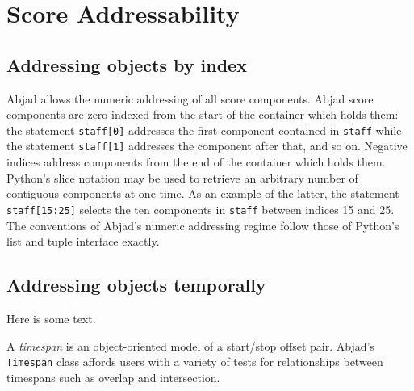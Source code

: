\section{Score Addressability}\label{sec:score_addressability}

\subsection{Addressing objects by index}

Abjad allows the numeric addressing of all score components. Abjad score
components are zero-indexed from the start of the container which holds them:
the statement \texttt{staff[0]} addresses the first component contained in
\texttt{staff} while the statement \texttt{staff[1]} addresses the component
after that, and so on. Negative indices address components from the end of the
container which holds them. Python's slice notation may be used to retrieve an
arbitrary number of contiguous components at one time. As an example of the
latter, the statement \texttt{staff[15:25]} selects the ten components in
\texttt{staff} between indices 15 and 25. The conventions of Abjad's numeric
addressing regime follow those of Python's list and tuple interface exactly. 

\subsection{Addressing objects temporally}

Here is some text.

A \emph{timespan} is an object-oriented model of a start/stop offset pair.
Abjad's \texttt{Timespan} class affords users with a variety of tests for
relationships between timespans such as overlap and intersection.

